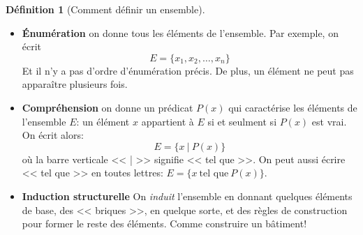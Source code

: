 \documentclass[11pt]{article}
\theoremstyle{definition}
\newtheorem{defn}{Définition}[section]
\theoremstyle{remark}
\begin{document}
\begin{defn}[Comment définir un ensemble]\leavevmode
\begin{itemize}
\item \textbf{Énumération} on donne tous les éléments de l'ensemble. Par exemple, on écrit
\[
E=\{x_1,x_2,\ldots,x_n\}
\]
Et il n'y a pas d'ordre d'énumération précis. De plus, un élément ne peut pas apparaître plusieurs fois.
\item \textbf{Compréhension} on donne un prédicat $P(x)$ qui caractérise les éléments de l'ensemble $E$: un élément $x$ appartient à $E$ si et seulment si $P(x)$ est vrai. On écrit alors:
\[ E = \{x\ |\ P(x)\} \]
où la barre verticale << | >> signifie << tel que >>. On peut aussi écrire << tel que >> en toutes lettres: $E = \{x\ \text{tel que}\ P(x)\}$.
\item \textbf{Induction structurelle} On \textit{induit} l'ensemble en donnant quelques éléments de base, des << briques >>, en quelque sorte, et des règles de construction pour former le reste des éléments. Comme construire un bâtiment!
\end{itemize}
\end{defn}
\end{document}
